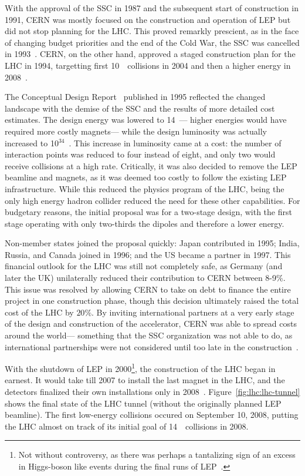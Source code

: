 
With the approval of the SSC in 1987 and the subsequent start of construction in 1991, CERN was mostly focused on the construction and operation of LEP but did not stop planning for the LHC. This proved remarkly prescient, as in the face of changing budget priorities and the end of the Cold War, the SSC was cancelled in 1993~\cite{SASSC}. CERN, on the other hand, approved a staged construction plan for the LHC in 1994, targetting first 10~\TeV~collisions in 2004 and then a higher energy in 2008~\cite{LHCWeb}.

The Conceptual Design Report~\cite{LHCCDR} published in 1995 reflected the changed landscape with the demise of the SSC and the results of more detailed cost estimates. The design energy was lowered to 14~\TeV--- higher energies would have required more costly magnets--- while the design luminosity was actually increased to 10$^{34}$~\lumirate. This increase in luminosity came at a cost: the number of interaction points was reduced to four instead of eight, and only two would receive collisions at a high rate. Critically, it was also decided to remove the LEP beamline and magnets, as it was deemed too costly to follow the existing LEP infrastructure. While this reduced the physics program of the LHC, being the only high energy hadron collider reduced the need for these other capabilities. For budgetary reasons, the initial proposal was for a two-stage design, with the first stage operating with only two-thirds the dipoles and therefore a lower energy.

Non-member states joined the proposal quickly: Japan contributed in 1995; India, Russia, and Canada joined in 1996; and the US became a partner in 1997. This financial outlook for the LHC was still not completely safe, as Germany (and later the UK) unilaterally reduced their contribution to CERN between 8-9$\%$. This issue was resolved by allowing CERN to take on debt to finance the entire project in one construction phase, though this decision ultimately raised the total cost of the LHC by $20\%$. By inviting international partners at a very early stage of the design and construction of the accelerator, CERN was able to spread costs around the world--- something that the SSC organization was not able to do, as international partnerships were not considered until too late in the construction~\cite{SASSC}.


With the shutdown of LEP in 2000\footnote{Not without controversy, as there was perhaps a tantalizing sign of an excess in Higgs-boson like events during the final runs of LEP~\cite{LEPHiggs}.}, the construction of the LHC began in earnest. It would take till 2007 to install the last magnet in the LHC, and the detectors finalized their own installations only in 2008~\cite{LHCWeb}. Figure~\ref{fig:lhc:lhc-tunnel} shows the final state of the LHC tunnel (without the originally planned LEP beamline). The first low-energy collisions occured on September 10, 2008, putting the LHC almost on track of its initial goal of 14~\TeV~collisions in 2008.

